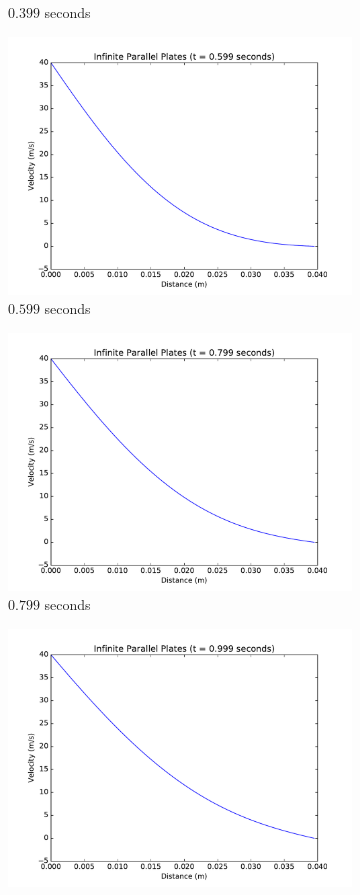 \documentclass[addpoints]{exam}
\begin{document}
\begin{questions}
\begin{parts}
\begin{solution}
\begin{itemize}
\begin{figure}[H]
\begin{subfigure}{.5\textwidth}
  \caption{$0.399$ seconds}
  \label{fig:0.4_CN2}
\end{subfigure}
\begin{subfigure}{.5\textwidth}
  \centering
  \includegraphics[width=.8\linewidth]{figs/0-599_sec_plot_CN2.pdf}
  \caption{$0.599$ seconds}
  \label{fig:0.6_CN2}
\end{subfigure}
\begin{subfigure}{.5\textwidth}
  \centering
  \includegraphics[width=.8\linewidth]{figs/0-799_sec_plot_CN2.pdf}
  \caption{$0.799$ seconds}
  \label{fig:0.8_CN2}
\end{subfigure}
\begin{subfigure}{.5\textwidth}
  \centering
  \includegraphics[width=.8\linewidth]{figs/0-999_sec_plot_CN2.pdf}

\end{subfigure}
\end{figure}
\end{itemize}
\end{solution}
\end{parts}
\end{questions}
\end{document}
